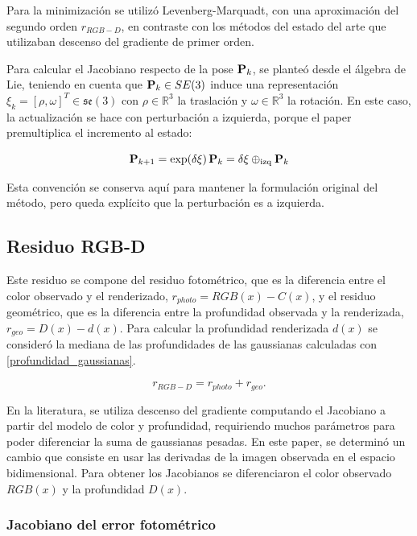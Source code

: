 Para la minimización se utilizó Levenberg-Marquadt, con una aproximación del segundo orden $r_{RGB-D}$, en contraste con los métodos del estado del arte que utilizaban descenso del gradiente de primer orden.

Para calcular el Jacobiano respecto de la pose $\mathbf{P}_k$, se planteó desde el álgebra de Lie, teniendo en cuenta que $\mathbf{P}_k \in SE(3)$ induce una representación $\xi_k = [\rho, \omega]^T \in \mathfrak{se}(3)$ con $\rho \in \mathbb{R}^3$ la traslación y $\omega \in \mathbb{R}^3$ la rotación. En este caso, la actualización se hace con perturbación a izquierda, porque el paper premultiplica el incremento al estado:

\begin{equation}
\mathbf{P}_{k+1} = \exp(\delta \xi)\,\mathbf{P}_k = \delta \xi \oplus_{\mathrm{izq}} \mathbf{P}_k
\end{equation}

Esta convención se conserva aquí para mantener la formulación original del método, pero queda explícito que la perturbación es a izquierda.

\subsection{Residuo RGB-D}
Este residuo se compone del residuo fotométrico, que es la diferencia entre el color observado y el renderizado, $r_{photo} = RGB(x) - C(x)$, y el residuo geométrico, que es la diferencia entre la profundidad observada y la renderizada, $r_{geo} = D(x) - d(x)$. Para calcular la profundidad renderizada $d(x)$ se consideró la mediana de las profundidades de las gaussianas calculadas con \ref{profundidad_gaussianas}.

\begin{equation}
r_{RGB-D} = r_{photo} + r_{geo}.
\end{equation}

En la literatura, se utiliza descenso del gradiente computando el Jacobiano a partir del modelo de color y profundidad, requiriendo muchos parámetros para poder diferenciar la suma de gaussianas pesadas. En este paper, se determinó un cambio que consiste en usar las derivadas de la imagen observada en el espacio bidimensional. Para obtener los Jacobianos se diferenciaron el color observado $RGB(x)$ y la profundidad $D(x)$.

\subsubsection{Jacobiano del error fotométrico}

